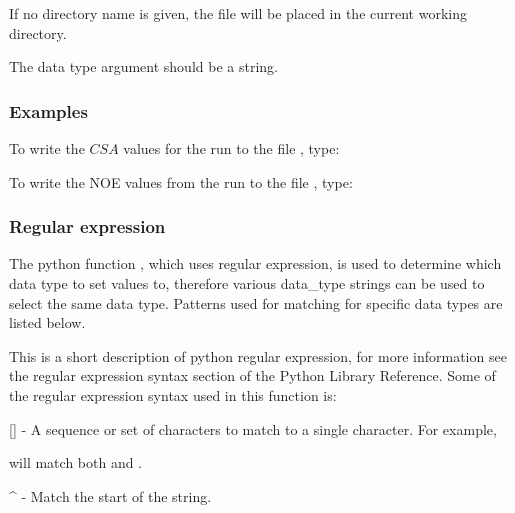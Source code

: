 If no directory name is given, the file will be placed in the current working directory.

The data type argument should be a string.


\subsubsection{Examples}

To write the $CSA$ values for the run 
 to the file 
, type:





To write the NOE values from the run 
 to the file 
, type:









\subsubsection{Regular expression}

The python function 
, which uses regular expression, is used to determine which data
type to set values to, therefore various data\_type strings can be used to select the same
data type.  Patterns used for matching for specific data types are listed below.

This is a short description of python regular expression, for more information see the
regular expression syntax section of the Python Library Reference.  Some of the regular
expression syntax used in this function is:

    [] - A sequence or set of characters to match to a single character.  For example,
    
 will match both 
 and 
.

    \^{} - Match the start of the string.

